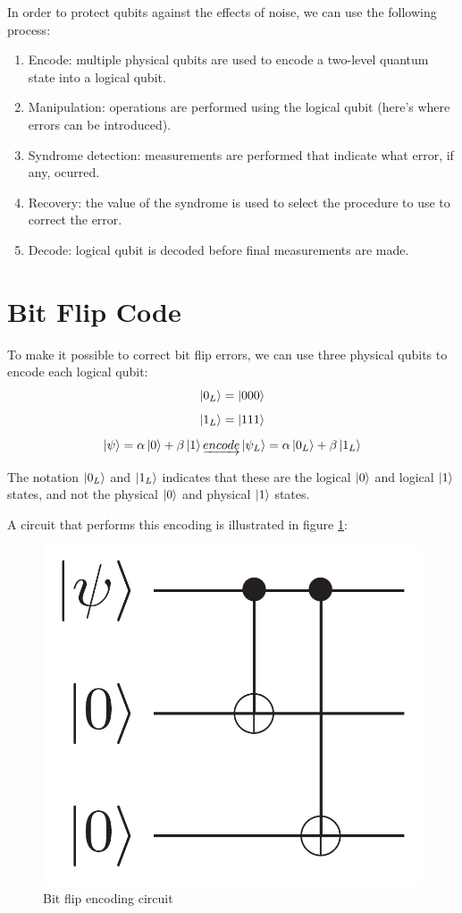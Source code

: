 In order to protect qubits against the effects of noise, we can use the following process:
\begin{enumerate}[noitemsep]
    \item Encode: multiple physical qubits are used to encode a two-level quantum state into a logical qubit.
    \item Manipulation: operations are performed using the logical qubit (here's where errors can be introduced).
    \item Syndrome detection: measurements are performed that indicate what error, if any, ocurred.
    \item Recovery: the value of the syndrome is used to select the procedure to use to correct the error.
    \item Decode: logical qubit is decoded before final measurements are made.
\end{enumerate}

\section{Bit Flip Code}

To make it possible to correct bit flip errors, we can use three physical qubits to encode each logical qubit:
$$\left|{0_L}\right\rangle=\left|{000}\right\rangle$$
$$\left|{1_L}\right\rangle=\left|{111}\right\rangle$$
$$\left|{\psi}\right\rangle=\alpha\left|{0}\right\rangle+\beta\left|{1}\right\rangle  \underrightarrow{encode}  \left|{{\psi}_{L}}\right\rangle=\alpha\left|{0_L}\right\rangle+\beta\left|{1_L}\right\rangle$$

The notation $\left|{0_L}\right\rangle$ and $\left|{1_L}\right\rangle$ indicates that these are the logical $\left|{0}\right\rangle$ and logical $\left|{1}\right\rangle$ states, and not the physical $\left|{0}\right\rangle$ and physical $\left|{1}\right\rangle$ states.

A circuit that performs this encoding is illustrated in figure \ref{fig:BitFlipEncodingCircuit}:

\begin{figure}[h!]
    \centering
    \includegraphics[scale=.25]{images/ErrorCorrection-BitFlipEncodingCircuit.png}
    \caption{Bit flip encoding circuit \cite{NielsenChuang_2012}}
    \label{fig:BitFlipEncodingCircuit}
\end{figure}

